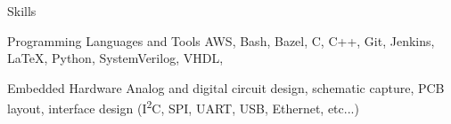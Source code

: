\section{\faToolbox}{Skills}

\resumeEntryStart
    \resumeEntryS
        {Programming Languages and Tools}
        {
            AWS,
            Bash,
            Bazel,
            C,
            C++,
            Git,
            Jenkins,
            \LaTeX,
            Python,
            SystemVerilog,
            VHDL,
        }

    \resumeEntryS
        {Embedded Hardware}
        {
            Analog and digital circuit design, schematic capture,
            PCB layout, interface design (I\textsuperscript{2}C, SPI,
            UART, USB, Ethernet, etc...)
        }

    \vspace{5pt}

\resumeEntryEnd
